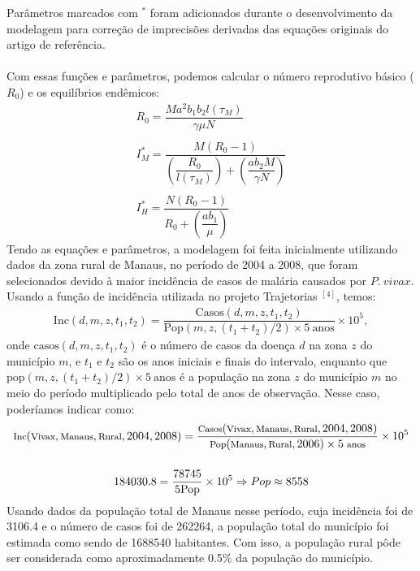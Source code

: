 \documentclass[12pt]{article}
\begin{document}
\vspace{1cm}
Parâmetros marcados com $^*$ foram adicionados durante o desenvolvimento da modelagem para correção de imprecisões derivadas das equações originais do artigo de referência.
\\\\
Com essas funções e parâmetros, podemos calcular o número reprodutivo básico ($R_0$) e os equilíbrios endêmicos:
\begin{gather*}
R_0 = \dfrac{Ma^2b_1b_2l(\tau_M)}{\gamma \mu N} \\
\\
I_M^* = \dfrac{M(R_0-1)}{(\dfrac{R_0}{l(\tau_M)}) + (\dfrac{ab_2M}{\gamma N})} \\
\\
I_H^* = \dfrac{N(R_0-1)}{R_0 + (\dfrac{ab_1}{\mu})}
\end{gather*}
Tendo as equações e parâmetros, a modelagem foi feita inicialmente utilizando dados da zona rural de Manaus, no período de 2004 a 2008, que foram selecionados devido à maior incidência de casos de malária causados por $P. \ vivax$. Usando a função de incidência utilizada no projeto Trajetorias $^{[4]}$, temos:
\begin{gather*}
    \text{Inc}(d, m, z, t_1, t_2) = \dfrac{\text{Casos}(d, m, z, t_1, t_2)}{\text{Pop}(m,z,(t_1+t_2)/2) \times 5 \ \text{anos}} \times 10^5,
\end{gather*}
onde $\text{casos}(d, m, z, t_1, t_2)$ é o número de casos da doença $d$ na zona $z$ do município $m$, e $t_1$ e $t_2$ são os anos iniciais e finais do intervalo, enquanto que $\text{pop}(m,z,(t_1+t_2)/2) \times 5 \ \text{anos}$ é a população na zona $z$ do município $m$ no meio do período multiplicado pelo total de anos de observação. Nesse caso, poderíamos indicar como:
\begin{gather*}
    \footnotesize{\text{Inc}(\text{Vivax}, \text{Manaus}, \text{Rural}, 2004, 2008) = \dfrac{\text{Casos}(\text{Vivax}, \text{Manaus}, \text{Rural}, 2004, 2008)}{\text{Pop}(\text{Manaus}, \text{Rural}, 2006) \times 5 \ \text{anos}} \times 10^5}  \\\\
    184030.8 = \dfrac{78745}{5\text{Pop}} \times 10^5 \Rightarrow Pop \approx 8558
\end{gather*}
Usando dados da população total de Manaus nesse período, cuja incidência foi de 3106.4 e o número de casos foi de 262264, a população total do município foi estimada como sendo de 1688540 habitantes. Com isso, a população rural pôde ser considerada como aproximadamente 0.5$\%$ da população do município.
\end{document}
